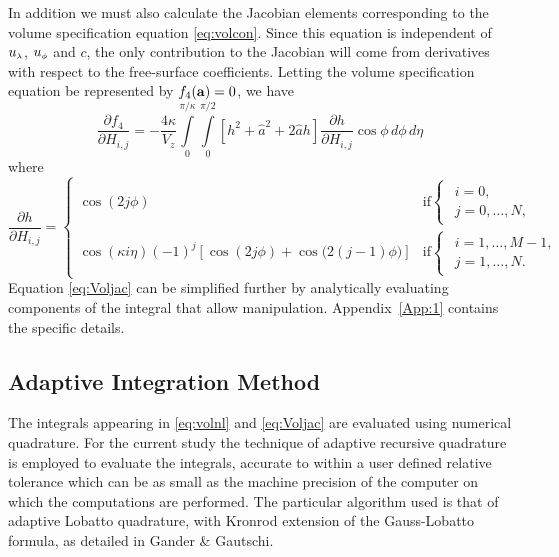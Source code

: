 In addition we must also calculate the Jacobian elements corresponding to the volume specification equation \eqref{eq:volcon}. Since this equation is independent of ${u_{\scriptscriptstyle \lambda}}$, ${u_{\scriptscriptstyle \phi}}$ and $c$, the only contribution to the Jacobian will come from derivatives with respect to the free-surface coefficients. Letting the volume specification equation be represented by $f_4(\mathbf{a})=0$, we have
\begin{equation}
\frac{\partial f_4}{\partial H_{i,j}} = -\frac{4\kappa}{V_z} \int\limits_0^{\pi/\kappa} \int\limits_0^{\pi/2} \left[ h^2 +\hat{a}^2+2\hat{a}h  \right]\frac{\partial h}{\partial H_{i,j}}\cos\phi \,d\phi\, d\eta \label{eq:Voljac}
\end{equation}
where
\begin{equation}
\frac{\partial h}{\partial H_{i,j}}=\begin{cases} \cos(2j\phi)& \text{if} \begin{cases}\begin{array}{l} i=0, \\ j=0,\ldots,N,\end{array}\end{cases} \\[5mm]
\cos(\kappa i \eta)(-1)^j\left[\cos(2j\phi)+\cos \bigl(2(j-1)\phi \bigr) \right]& \text{if} \begin{cases} \begin{array}{l} i=1,\ldots,M-1, \\ j=1,\ldots,N. \end{array}\end{cases} 
\end{cases} \label{eq:dhdH}
\end{equation}
Equation \eqref{eq:Voljac} can be simplified further by analytically evaluating components of the integral that allow manipulation. Appendix~\ref{App:1} contains the specific details.

\subsection{Adaptive Integration Method}
The integrals appearing in \eqref{eq:volnl} and \eqref{eq:Voljac} are evaluated using numerical quadrature. For the current study the technique of adaptive recursive quadrature is employed to evaluate the integrals, accurate to within a user defined relative tolerance which can be as small as the machine precision of the computer on which the computations are performed. The particular algorithm used is that of adaptive Lobatto quadrature, with Kronrod extension of the Gauss-Lobatto formula, as detailed in Gander \& Gautschi\cite{Gander:AQR}. 

